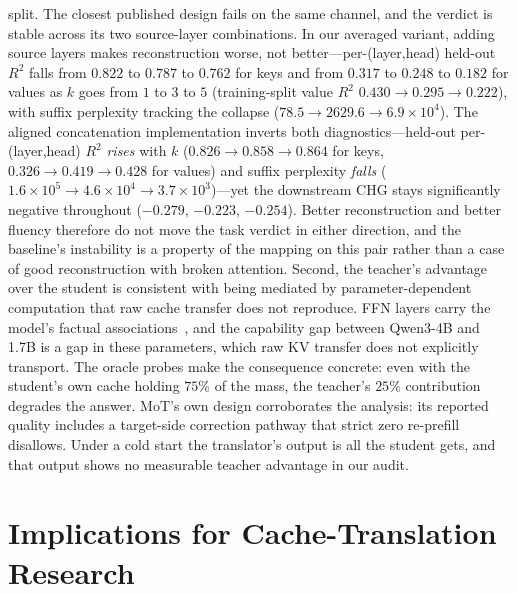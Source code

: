 \documentclass[10pt]{article}
\begin{document}
split. The closest published design fails on the same channel, and the verdict
is stable across its two source-layer combinations. In our averaged variant,
adding source layers makes reconstruction worse, not better---per-(layer,head)
held-out $R^2$ falls from $0.822$ to $0.787$ to $0.762$ for keys and from
$0.317$ to $0.248$ to $0.182$ for values as $k$ goes from $1$ to $3$ to $5$
(training-split value $R^2$ $0.430 \to 0.295 \to 0.222$), with suffix
perplexity tracking the collapse ($78.5 \to 2629.6 \to 6.9\times10^{4}$). The
aligned concatenation implementation inverts both diagnostics---held-out
per-(layer,head) $R^2$ \emph{rises} with $k$ ($0.826 \to 0.858 \to 0.864$ for
keys, $0.326 \to 0.419 \to 0.428$ for values) and suffix perplexity
\emph{falls} ($1.6\times10^{5} \to 4.6\times10^{4} \to 3.7\times10^{3}$)---yet
the downstream CHG stays significantly negative throughout ($-0.279$, $-0.223$,
$-0.254$). Better reconstruction and better fluency therefore do not move the
task verdict in either direction, and the baseline's instability is a property
of the mapping on this pair rather than a case of good reconstruction with
broken attention. Second, the teacher's advantage over the student is consistent with
being mediated by parameter-dependent computation that raw cache transfer does
not reproduce. FFN layers carry the model's factual
associations~\citep{ffnmemory2021}, and the capability gap between Qwen3-4B
and 1.7B is a gap in these parameters, which raw KV transfer does not explicitly transport. The
oracle probes make the consequence concrete: even with the student's own
cache holding $75\%$ of the mass, the teacher's $25\%$ contribution degrades
the answer. MoT's own design corroborates the analysis: its reported quality
includes a target-side correction pathway that strict zero re-prefill disallows. Under a cold
start the translator's output is all the student gets, and that output shows
no measurable teacher advantage in our audit.

\section{Implications for Cache-Translation Research}
\label{sec:implications}
\end{document}
